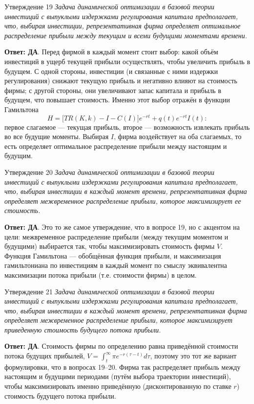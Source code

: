 \documentclass[10pt,a4paper]{article}
\newcommand{\qda}{\textbf{\color{yesgreen}Ответ: ДА}}
\newenvironment{answer}[2]{%
  \begin{qbox}{Утверждение #1}
  \textit{#2}\par\smallskip
}{%
  \end{qbox}\vspace{2pt}
}
\begin{document}
\begin{answer}{19}{Задача динамической оптимизации в базовой теории инвестиций с выпуклыми издержками регулирования капитала предполагает, что, выбирая инвестиции, репрезентативная фирма определяет оптимальное распределение прибыли между текущим и всеми будущими моментами времени.}
\qda. Перед фирмой в каждый момент стоит выбор: какой объём инвестиций в ущерб текущей прибыли осуществлять, чтобы увеличить прибыль в будущем. С одной стороны, инвестиции (и связанные с ними издержки регулирования) снижают текущую прибыль и негативно влияют на стоимость фирмы; с другой стороны, они увеличивают запас капитала и прибыль в будущем, что повышает стоимость. Именно этот выбор отражён в функции Гамильтона
\[
H=\bigl[TR(K,k)-I-C(I)\bigr]e^{-rt}+q(t)e^{-rt}I(t):
\]
первое слагаемое --- текущая прибыль, второе --- возможность извлекать прибыль во все будущие моменты. Выбирая $I$, фирма воздействует на оба слагаемых, то есть определяет оптимальное распределение прибыли между настоящим и будущим.
\end{answer}

\begin{answer}{20}{Задача динамической оптимизации в базовой теории инвестиций с выпуклыми издержками регулирования капитала предполагает, что, выбирая инвестиции в каждый момент времени, репрезентативная фирма определяет межвременное распределение прибыли, которое максимизирует ее стоимость.}
\qda. Это то же самое утверждение, что в вопросе 19, но с акцентом на цели: межвременное распределение прибыли (между текущим моментом и будущими) выбирается так, чтобы максимизировать стоимость фирмы $V$. Функция Гамильтона --- обобщённая функция прибыли, и максимизация гамильтониана по инвестициям в каждый момент по смыслу эквивалентна максимизации потока прибыли (т.е. стоимости фирмы) в целом.
\end{answer}

\begin{answer}{21}{Задача динамической оптимизации в базовой теории инвестиций с выпуклыми издержками регулирования капитала предполагает, что, выбирая инвестиции в каждый момент времени, репрезентативная фирма определяет межвременное распределение прибыли, которое максимизирует приведенную стоимость будущего потока прибыли.}
\qda. Стоимость фирмы по определению равна приведённой стоимости потока будущих прибылей, $V=\int_t^\infty\pi e^{-r(\tau-t)}d\tau$, поэтому это тот же вариант формулировки, что в вопросах 19--20. Фирма так распределяет прибыль между настоящим и будущими периодами (путём выбора траектории инвестиций), чтобы максимизировать именно приведённую (дисконтированную по ставке $r$) стоимость будущего потока прибыли.
\end{answer}
\end{document}
